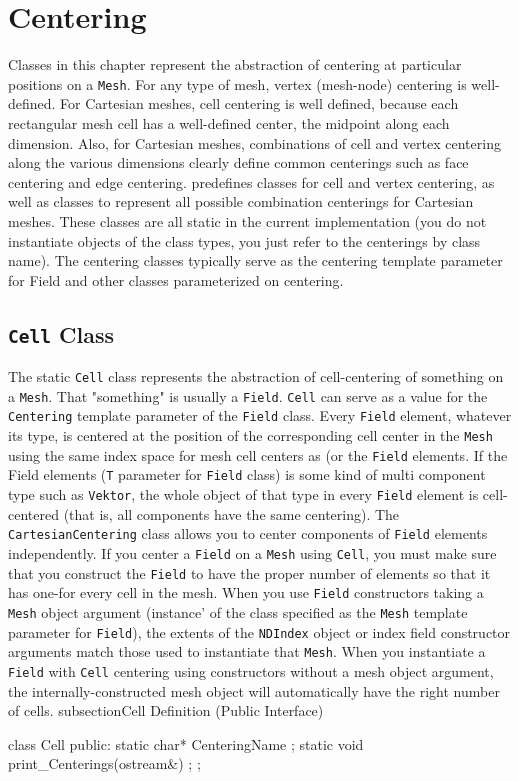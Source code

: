 \chapter{Centering}
\label{sec:cent}
Classes in this chapter represent the abstraction of centering at particular positions on a \texttt{Mesh}. 
For any type of mesh, vertex (mesh-node) centering is well-defined. For Cartesian meshes, cell centering is well defined, because each 
rectangular mesh cell has a well-defined center, the midpoint along each dimension. Also, for Cartesian meshes, combinations of cell and vertex centering 
along the various dimensions clearly define common centerings such as face centering and edge centering. \ippl predefines classes for cell and vertex centering, 
as well as classes to represent all possible combination centerings for Cartesian meshes. These classes are all static in the current implementation 
(you do not instantiate objects of the class types, you just refer to the centerings by class name). The centering classes typically serve as the centering 
template parameter for Field and other \ippl classes parameterized on centering. 
\section{\texttt{Cell} Class}
The static \texttt{Cell} class represents the abstraction of cell-centering of something on a \texttt{Mesh}. 
That "something" is usually a \texttt{Field}. \texttt{Cell} can serve as a value for the \texttt{Centering} template parameter of the \texttt{Field} class. Every \texttt{Field} element, whatever its type, 
is centered at the position of the corresponding cell center in the \texttt{Mesh} using the same index space for mesh cell centers as 
(or the \texttt{Field} elements. If the Field elements (\texttt{T} parameter for \texttt{Field} class) is some kind of multi component type such as \texttt{Vektor}, the whole object of that type in every \texttt{Field} 
element is cell-centered (that is, all components have the same centering). The \texttt{CartesianCentering} class allows you to center components of \texttt{Field} elements independently. 
If you center a \texttt{Field} on a \texttt{Mesh} using \texttt{Cell}, you must make sure that you construct the \texttt{Field} to have the proper number of elements so that it has one-for every cell in the mesh. 
When you use \texttt{Field} constructors taking a \texttt{Mesh} object argument (instance' of the class specified as the \texttt{Mesh} template parameter for \texttt{Field}), the extents of the 
\texttt{NDIndex} object or index field constructor arguments match those used to instantiate that \texttt{Mesh}. When you instantiate a \texttt{Field} with \texttt{Cell} centering using 
constructors without a mesh object argument, the internally-constructed mesh object will automatically have the right number of cells. 
subsection{Cell Definition (Public Interface)}
\begin{smallcode}
class Cell { 
public: 
    static char* CenteringName ;
    static void print_Centerings(ostream&) ;
}; 
\end{smallcode}



